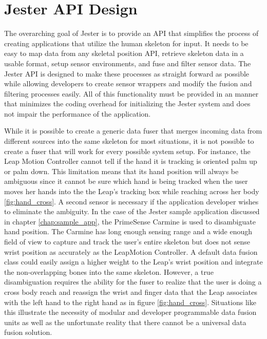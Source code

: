 \chapter{Jester API Design}\label{chap:api_des}

The overarching goal of Jester is to provide an API that simplifies the process of creating applications that utilize the human skeleton for input. It needs to be easy to map data from any skeletal position API, retrieve skeleton data in a usable format, setup sensor environments, and fuse and filter sensor data. The Jester API is designed to make these processes as straight forward as possible while allowing developers to create sensor wrappers and modify the fusion and filtering processes easily. All of this functionality must be provided in an manner that minimizes the coding overhead for initializing the Jester system and does not impair the performance of the application.

While it is possible to create a generic data fuser that merges incoming data from different sources into the same skeleton for most situations, it is not possible to create a fuser that will work for every possible system setup. For instance, the Leap Motion Controller cannot tell if the hand it is tracking is oriented palm up or palm down. This limitation means that its hand position will always be ambiguous since it cannot be sure which hand is being tracked when the user moves her hands into the the Leap’s tracking box while reaching across her body \ref{fig:hand_cross}. A second sensor is necessary if the application developer wishes to eliminate the ambiguity. In the case of the Jester sample application discussed in chapter \ref{chap:sample_app}, the PrimeSense Carmine is used to disambiguate hand position. The Carmine has long enough sensing range and a wide enough field of view to capture and track the user’s entire skeleton but does not sense wrist position as accurately as the LeapMotion Controller. A default data fusion class could easily assign a higher weight to the Leap’s wrist position and integrate the non-overlapping bones into the same skeleton. However, a true disambiguation requires the ability for the fuser to realize that the user is doing a cross body reach and reassign the wrist and finger data that the Leap associates with the left hand to the right hand as in figure \ref{fig:hand_cross}. Situations like this illustrate the necessity of modular and developer programmable data fusion units as well as the unfortunate reality that there cannot be a universal data fusion solution.

